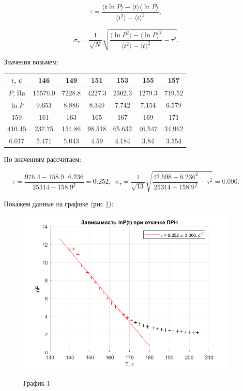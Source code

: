 \documentclass[a4paper,12pt]{article}
\begin{document}
\begin{enumerate}
\begin{enumerate}
\[
\tau = \frac{\langle t\ln{P} \rangle - \langle t \rangle \langle \ln{P} \rangle}{\langle t^2 \rangle - \langle t \rangle ^ 2},
\]

\[
\sigma_\tau = \frac{1}{\sqrt{N}}\sqrt{\frac{\langle \ln{P}^2 \rangle - \langle \ln{P} \rangle ^ 2}{\langle t^2 \rangle - \langle t \rangle ^ 2} - \tau^2}.
\]

Значения возьмем:
\begin{center}
\begin{tabular}{|c|c|c|c|c|c|c|}
\hline 
$t$, c & 146 & 149 & 151 & 153 & 155 & 157 \\
\hline
$P$, Па & 15576.0 & 7228.8 & 4227.3 & 2302.3 & 1279.3 & 719.52\\
\hline
$\ln{P}$ & 9.653 & 8.886 & 8.349 & 7.742 & 7.154 & 6.579\\
\hline 
\hline 
159 & 161 & 163 & 165 & 167 & 169 & 171\\
\hline
410.45 & 237.75 & 154.86 & 98.518 & 65.632 & 46.547 & 34.962\\
\hline
6.017 & 5.471 & 5.043 & 4.59 & 4.184 & 3.84 & 3.554\\
\hline
\end{tabular} 
\end{center}

По значениям рассчитаем:

\[
\tau = \frac{ 976.4  -  158.9 \cdot  6.236 }{ 25314  -  158.9 ^ 2} = 0.252, \;\;
\sigma_\tau = \frac{1}{\sqrt{13}}\sqrt{\frac{42.598 - 6.236 ^ 2}{ 25314  -  158.9 ^ 2} - \tau^2} = 0.006.
\]

Покажем данные на графике (рис \ref{fig1}):

\begin{figure}
\centering
\includegraphics[width=0.8\linewidth]{plot1.png}
\label{fig1}
\caption{График 1}
\end{figure}


\end{enumerate}
\end{enumerate}
\end{document}

